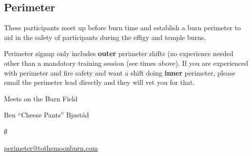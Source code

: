 \begin{multicols}{2}

\subsection*{Perimeter}
These participants meet up before burn time and establish a burn perimeter to aid in the safety of participants during the \gls{effigy} and \gls{temple} burns.




Perimeter signup only includes \textbf{outer} perimeter shifts (no experience needed other than a mandatory training session (see times above). If you are experienced with perimeter and fire safety and want a shift doing \textbf{inner} perimeter, please email the perimeter lead directly and they will vet you for that.

Meets on the Burn Field

\begin{description}[leftmargin=6em,noitemsep,style=nextline]
   \item[Lead:] Ben ``Cheese Pants'' Bj{\o}st{\aa}d
   \item[Co-leads:] $\emptyset$
   \item[Contact:] \url{perimeter@tothemoonburn.com}
\end{description}



\end{multicols}
